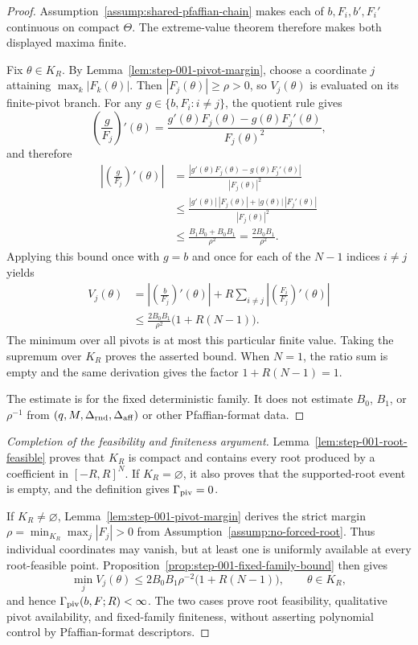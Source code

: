 \begin{proof}
Assumption~\ref{assump:shared-pfaffian-chain} makes each of
$b,F_i,b',F_i'$ continuous on compact $\Theta$.  The extreme-value theorem
therefore makes both displayed maxima finite.

Fix $\theta\in K_R$.  By Lemma~\ref{lem:step-001-pivot-margin}, choose a
coordinate $j$ attaining $\max_k|F_k(\theta)|$.  Then
$|F_j(\theta)|\geq\rho>0$, so $V_j(\theta)$ is evaluated on its finite-pivot
branch.  For any $g\in\{b,F_i:i\neq j\}$, the quotient rule gives
\[
\left(\frac g{F_j}\right)'(\theta)
=\frac{g'(\theta)F_j(\theta)-g(\theta)F_j'(\theta)}{F_j(\theta)^2},
\]
and therefore
\[
\begin{aligned}
\left|\left(\frac g{F_j}\right)'(\theta)\right|
&=\frac{|g'(\theta)F_j(\theta)-g(\theta)F_j'(\theta)|}
{|F_j(\theta)|^2}\\
&\leq
\frac{|g'(\theta)|\,|F_j(\theta)|
      +|g(\theta)|\,|F_j'(\theta)|}{|F_j(\theta)|^2}\\
&\leq\frac{B_1B_0+B_0B_1}{\rho^2}
=\frac{2B_0B_1}{\rho^2}.
\end{aligned}
\]
Applying this bound once with $g=b$ and once for each of the $N-1$ indices
$i\neq j$ yields
\[
\begin{aligned}
V_j(\theta)
&=\left|\left(\frac b{F_j}\right)'(\theta)\right|
+R\sum_{i\neq j}
 \left|\left(\frac{F_i}{F_j}\right)'(\theta)\right|\\
&\leq\frac{2B_0B_1}{\rho^2}\bigl(1+R(N-1)\bigr).
\end{aligned}
\]
The minimum over all pivots is at most this particular finite value.  Taking
the supremum over $K_R$ proves the asserted bound.  When $N=1$, the ratio
sum is empty and the same derivation gives the factor
$1+R(N-1)=1$.

The estimate is for the fixed deterministic family.  It does not estimate
$B_0$, $B_1$, or $\rho^{-1}$ from
$(q,M,\Delta_{\rm rnd},\Delta_{\rm aff})$ or other Pfaffian-format data.
\end{proof}

\begin{proof}[Completion of the feasibility and finiteness argument]
Lemma~\ref{lem:step-001-root-feasible} proves that $K_R$ is compact and
contains every root produced by a coefficient in $[-R,R]^N$.  If
$K_R=\varnothing$, it also proves that the supported-root event is empty,
and the definition gives $\Gamma_{\rm piv}=0$.

If $K_R\neq\varnothing$, Lemma~\ref{lem:step-001-pivot-margin} derives the
strict margin
$\rho=\min_{K_R}\max_j|F_j|>0$ from
Assumption~\ref{assump:no-forced-root}.  Thus individual coordinates may
vanish, but at least one is uniformly available at every root-feasible
point.  Proposition~\ref{prop:step-001-fixed-family-bound} then gives
\[
\min_jV_j(\theta)
\leq2B_0B_1\rho^{-2}\bigl(1+R(N-1)\bigr),
\qquad \theta\in K_R,
\]
and hence $\Gamma_{\rm piv}(b,F;R)<\infty$.  The two cases prove root
feasibility, qualitative pivot availability, and fixed-family finiteness,
without asserting polynomial control by Pfaffian-format descriptors.
\end{proof}

